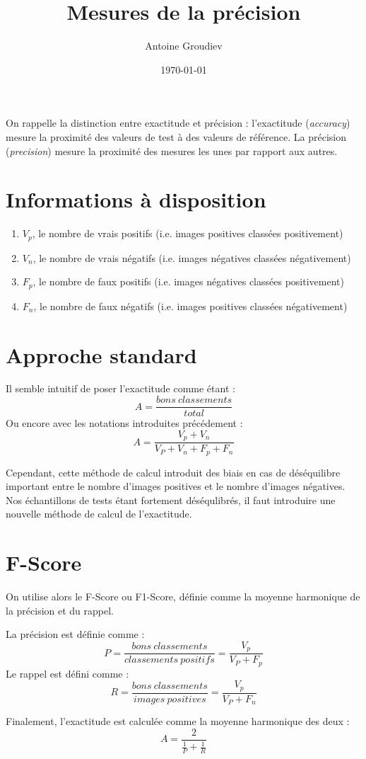 \documentclass[12pt,a4paper]{article}
\author{Antoine Groudiev}
\title{Mesures de la précision}
\date{\today}
\begin{document}

On rappelle la distinction entre exactitude et précision : l'exactitude (\textit{accuracy}) mesure la proximité des valeurs de test à des valeurs de référence. La précision (\textit{precision}) mesure la proximité des mesures les unes par rapport aux autres.

\section{Informations à disposition}
\begin{enumerate}
    \item $V_p$, le nombre de vrais positifs (i.e. images positives classées positivement)
    \item $V_n$, le nombre de vrais négatifs (i.e. images négatives classées négativement)
    \item $F_p$, le nombre de faux positifs (i.e. images négatives classées positivement)
    \item $F_n$, le nombre de faux négatifs (i.e. images positives classées négativement)
\end{enumerate}

\section{Approche standard}
Il semble intuitif de poser l'exactitude comme étant :
$$ A = \frac{bons\ classements}{total} $$
Ou encore avec les notations introduites précédement :
$$\boxed{A = \frac{V_p + V_n}{V_P + V_n + F_p + F_n}}$$

Cependant, cette méthode de calcul introduit des biais en cas de déséquilibre important entre le nombre d'images positives et le nombre d'images négatives. Nos échantillons de tests étant fortement déséqulibrés, il faut introduire une nouvelle méthode de calcul de l'exactitude.

\section{F-Score}
On utilise alors le F-Score ou F1-Score, définie comme la moyenne harmonique de la précision et du rappel.

La précision est définie comme :
$$ P = \frac{bons\ classements}{classements\ positifs} = \boxed{\frac{V_p}{V_P + F_p}} $$
Le rappel est défini comme :
$$ R = \frac{bons\ classements}{images\ positives} = \boxed{\frac{V_p}{V_P + F_n}} $$

Finalement, l'exactitude est calculée comme la moyenne harmonique des deux :
$$\boxed{A = \frac{2}{\frac{1}{P} + \frac{1}{R}}}$$
\end{document}
